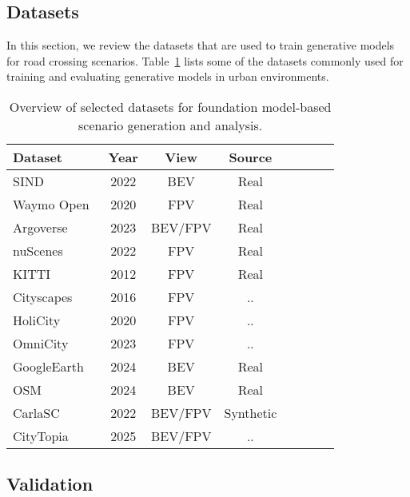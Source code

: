 \documentclass{article}
\begin{document}
\subsection{Datasets}

In this section, we review the datasets that are used to train generative models for road crossing scenarios. Table~\ref{tab:datasets} lists some of the datasets commonly used for training and evaluating generative models in urban environments.

\begin{table}[ht]
\centering
\caption{Overview of selected datasets for foundation model-based scenario generation and analysis.}
\label{tab:datasets}
\renewcommand{\arraystretch}{1.1}
\begin{tabular}{lccccccc}
\toprule
\textbf{Dataset} & \textbf{Year} & \textbf{View} & \textbf{Source} \\
\midrule
SIND~\cite{xu2022drone}             & 2022 & BEV        & Real         \\
Waymo Open~\cite{sun2020scalability}       & 2020 & FPV        & Real  \\
Argoverse~\cite{chang2019argoverse}\cite{wilson2023argoverse}        & 2023 & BEV/FPV    & Real \\
nuScenes~\cite{caesar2020nuscenes}      & 2022 & FPV        & Real \\
KITTI~\cite{geiger2012we}            & 2012 & FPV        & Real \\
Cityscapes~\cite{cordts2016cityscapes}      & 2016 & FPV        & .. \\
HoliCity~\cite{zhou2020holicity}          & 2020 & FPV        & .. \\
OmniCity~\cite{li2023omnicity}          & 2023 & FPV        & ..  \\
GoogleEarth~\cite{xie2024citydreamer}          & 2024 & BEV        & Real  \\
OSM~\cite{xie2024citydreamer}          & 2024 & BEV        & Real \\
CarlaSC~\cite{wilson2022motionsc}          & 2022 & BEV/FPV    & Synthetic \\
CityTopia~\cite{xie2025citydreamer4d}          & 2025 & BEV/FPV    & .. \\
\bottomrule
\end{tabular}
\end{table}

\subsection{Validation}
\end{document}

